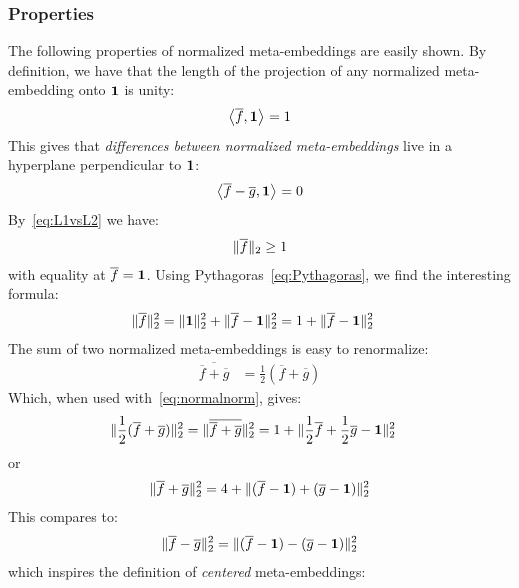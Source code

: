 \documentclass[a4paper,oneside,12pt,english]{report}
\def\expv#1#2{\bigl\langle#1\bigr\rangle_{#2}}
\def\dot#1#2{\expv{#1,#2}{}}
\def\normal#1{\overline{#1}}
\begin{document}
\subsubsection{Properties}
The following properties of normalized meta-embeddings are easily shown. By definition, we have that the length of the projection of any normalized meta-embedding onto $\boldsymbol{1}$ is unity:
\begin{align}
\label{eq:LR1}
\dot{\normal{f}}{\onevec} = 1
\end{align}
This gives that \emph{differences between normalized meta-embeddings} live in a hyperplane perpendicular to $\boldsymbol{1}$: 
\begin{align}
\dot{\normal{f}-\normal{g}}{\onevec} = 0
\end{align}
By~\eqref{eq:L1vsL2} we have:
\begin{align}
\norm{\normal{f}} \ge 1
\end{align} 
with equality at $\normal{f}=\onevec$. Using Pythagoras~\eqref{eq:Pythagoras}, we find the interesting formula:
\begin{align}
\label{eq:normalnorm}
\norm{\normal{f}}^2 &= \norm{\onevec}^2 + \norm{\normal{f}-\onevec}^2 
= 1 + \norm{\normal{f}-\onevec}^2 
\end{align}
The sum of two normalized meta-embeddings is easy to renormalize:
\begin{align}
\normal{\normal{f}+\normal{g}} &= \frac12(\normal{f}+\normal{g})
\end{align}
Which, when used with~\eqref{eq:normalnorm}, gives:
\begin{align}
\norm{\frac12(\normal{f}+\normal{g})}^2 &= \norm{\normal{\normal{f}+\normal{g}}}^2
= 1 + \norm{\frac12\normal{f}+\frac12\normal{g}-\onevec}^2
\end{align}
or
\begin{align}
\norm{\normal{f}+\normal{g}}^2 
= 4 + \norm{(\normal{f}-\onevec)+(\normal{g}-\onevec)}^2
\end{align}
This compares to:
\begin{align}
\norm{\normal{f}-\normal{g}}^2 
= \norm{(\normal{f}-\onevec)-(\normal{g}-\onevec)}^2
\end{align}
which inspires the definition of \emph{centered} meta-embeddings:	
	
\end{document}
